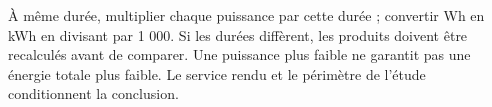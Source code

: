 \par\noindent\begin{minipage}{\linewidth}
\label{cor-activite-17}
À même durée, multiplier chaque puissance par cette durée ; convertir Wh en kWh en divisant par 1 000. Si les durées diffèrent, les produits doivent être recalculés avant de comparer. Une puissance plus faible ne garantit pas une énergie totale plus faible. Le service rendu et le périmètre de l’étude conditionnent la conclusion.\par\end{minipage}

